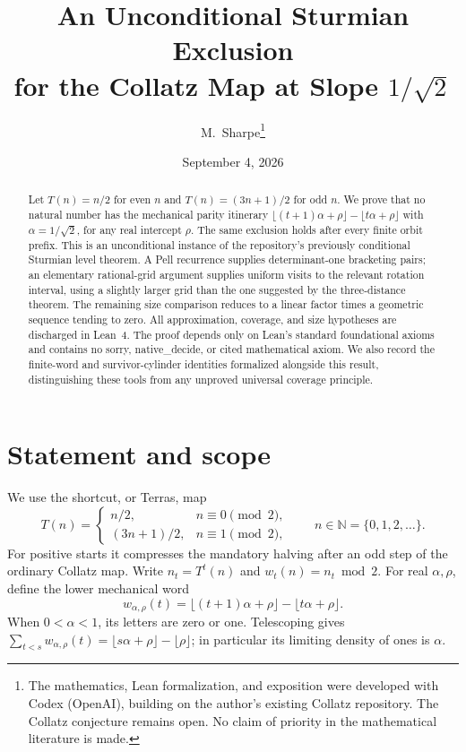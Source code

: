 \documentclass[11pt]{article}
\title{An Unconditional Sturmian Exclusion\\for the Collatz Map at Slope $1/\sqrt2$}
\author{M.~Sharpe\thanks{The mathematics, Lean formalization, and exposition were developed with Codex (OpenAI), building on the author's existing Collatz repository. The Collatz conjecture remains open. No claim of priority in the mathematical literature is made.}}
\date{September 4, 2026}
\theoremstyle{remark}
\newcommand{\N}{\mathbb N}
\newcommand{\code}[1]{{\small\ttfamily #1}}
\begin{document}
\maketitle
\begin{abstract}
Let $T(n)=n/2$ for even $n$ and $T(n)=(3n+1)/2$ for odd $n$.
We prove that no natural number has the mechanical parity itinerary
$\lfloor(t+1)\alpha+\rho\rfloor-\lfloor t\alpha+\rho\rfloor$ with
$\alpha=1/\sqrt2$, for any real intercept $\rho$. The same exclusion
holds after every finite orbit prefix. This is an unconditional instance
of the repository's previously conditional Sturmian level theorem.
A Pell recurrence supplies determinant-one bracketing pairs; an elementary
rational-grid argument supplies uniform visits to the relevant rotation
interval, using a slightly larger grid than the one suggested by the
three-distance theorem. The remaining size comparison reduces to a linear
factor times a geometric sequence tending to zero. All approximation,
coverage, and size hypotheses are discharged in Lean~4. The proof depends
only on Lean's standard foundational axioms and contains no \code{sorry},
\code{native\_\allowbreak{}decide}, or cited mathematical axiom. We also record the
finite-word and survivor-cylinder identities formalized alongside this
result, distinguishing these tools from any unproved universal coverage
principle.
\end{abstract}

\section{Statement and scope}
We use the shortcut, or Terras, map
\[
T(n)=\begin{cases}n/2,&n\equiv0\pmod2,\\(3n+1)/2,&n\equiv1\pmod2,\end{cases}
\qquad n\in\N=\{0,1,2,\ldots\}.
\]
For positive starts it compresses the mandatory halving after an odd step
of the ordinary Collatz map. Write $n_t=T^t(n)$ and $w_t(n)=n_t\bmod2$.
For real $\alpha,\rho$, define the lower mechanical word
\begin{equation}\label{eq:mechanical}
w_{\alpha,\rho}(t)=\lfloor(t+1)\alpha+\rho\rfloor-\lfloor t\alpha+\rho\rfloor.
\end{equation}
When $0<\alpha<1$, its letters are zero or one. Telescoping gives
$\sum_{t<s}w_{\alpha,\rho}(t)=\lfloor s\alpha+\rho\rfloor-\lfloor\rho\rfloor$;
in particular its limiting density of ones is $\alpha$.
\end{document}
